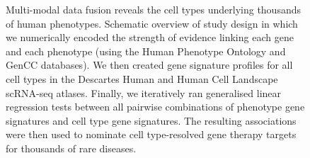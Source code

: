 \documentclass[
]{article}
\begin{document}
\begin{figure}


\caption{\label{fig-study-design}Multi-modal data fusion reveals the
cell types underlying thousands of human phenotypes. Schematic overview
of study design in which we numerically encoded the strength of evidence
linking each gene and each phenotype (using the Human Phenotype Ontology
and GenCC databases). We then created gene signature profiles for all
cell types in the Descartes Human and Human Cell Landscape scRNA-seq
atlases. Finally, we iteratively ran generalised linear regression tests
between all pairwise combinations of phenotype gene signatures and cell
type gene signatures. The resulting associations were then used to
nominate cell type-resolved gene therapy targets for thousands of rare
diseases.}

\end{figure}%
\end{document}
